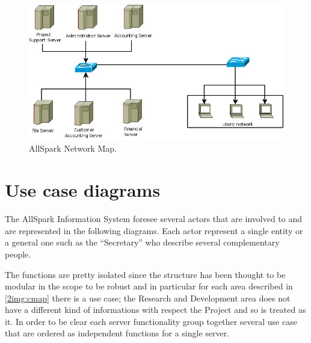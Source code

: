 \begin{figure}
\begin{centering}
\includegraphics[scale=0.45]{assign3/dia/NetMap.jpeg}
\caption{AllSpark Network Map.}
\label{2img:NetMap}
\end{centering}
\end{figure}


\section{Use case diagrams}
The AllSpark Information System foresee several actors that are involved to and are represented in the following diagrams. Each actor represent a single entity or a general one such as the ``Secretary'' who describe several complementary people.

The functions are pretty isolated since the structure has been thought to be modular in the scope to be robust and in particular for each area described in \ref{2img:cmap} there is a use case; the Research and Development area does not have a different kind of informations with respect the Project and so is treated as it. In order to be clear each server functionality group together several use case that are ordered as independent functions for a single server.
 
 

